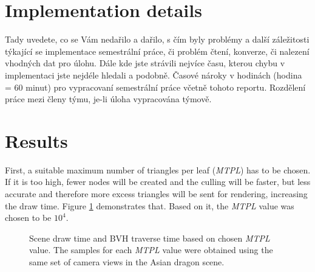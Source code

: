 \documentclass[report,11pt]{elsarticle}
\begin{document}
\section{\label{SEC:Pitfalls}Implementation details}

Tady uvedete, co se Vám nedařilo a dařilo, s čím byly problémy a další
záležitosti týkající se implementace semestrální práce, či problém
čtení, konverze, či nalezení vhodných dat pro úlohu. Dále kde jste
strávili nejvíce času, kterou chybu v implementaci jste nejdéle
hledali a podobně. Časové nároky v hodinách (hodina = 60 minut) pro
vypracovaní semestrální práce včetně tohoto reportu. Rozdělení práce
mezi členy týmu, je-li úloha vypracována týmově.

\section{\label{SEC:Results}Results}
First, a suitable maximum number of triangles per leaf (\emph{MTPL}) has to be chosen. If it is too high, fewer nodes will be created and the culling will be faster, but less accurate and therefore more excess triangles will be sent for rendering, increasing the draw time. Figure \ref{GRAPH:mtpl} demonstrates that. Based on it, the \emph{MTPL} value was chosen to be $10^{4}$.

\begin{figure}[H]
\caption{Scene draw time and BVH traverse time based on chosen \emph{MTPL} value. The samples for each \emph{MTPL} value were obtained using the same set of camera views in the Asian dragon scene.}
\label{GRAPH:mtpl}
\end{figure}
\end{document}

